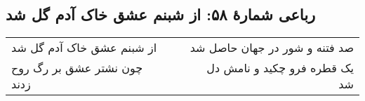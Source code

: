 \begin{center}
\section*{رباعی شمارهٔ ۵۸: از شبنم عشق خاک آدم گل شد}
\label{sec:058}
\begin{longtable}{l p{0.5cm} r}
از شبنم عشق خاک آدم گل شد
&&
صد فتنه و شور در جهان حاصل شد
\\
چون نشتر عشق بر رگ روح زدند
&&
یک قطره فرو چکید و نامش دل شد
\\
\end{longtable}
\end{center}
